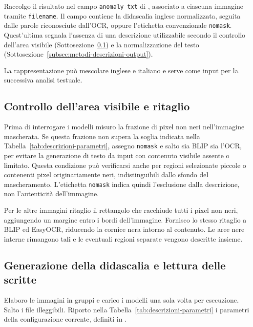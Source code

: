 Raccolgo il risultato nel campo \texttt{anomaly\_txt} di , associato a ciascuna immagine tramite \texttt{filename}. Il campo contiene la didascalia inglese normalizzata, seguita dalle parole riconosciute dall'OCR, oppure l'etichetta convenzionale \texttt{nomask}. Quest'ultima segnala l'assenza di una descrizione utilizzabile secondo il controllo dell'area visibile (Sottosezione~\ref{subsec:metodi-descrizioni-input}) e la normalizzazione del testo (Sottosezione~\ref{subsec:metodi-descrizioni-output}).

La rappresentazione può mescolare inglese e italiano e serve come input per la successiva analisi testuale.

\subsection{Controllo dell'area visibile e ritaglio}
\label{subsec:metodi-descrizioni-input}

Prima di interrogare i modelli misuro la frazione di pixel non neri nell'immagine mascherata. Se questa frazione non supera la soglia indicata nella Tabella~\ref{tab:descrizioni-parametri}, assegno \texttt{nomask} e salto sia BLIP sia l'OCR, per evitare la generazione di testo da input con contenuto visibile assente o limitato. Questa condizione può verificarsi anche per regioni selezionate piccole o contenenti pixel originariamente neri, indistinguibili dallo sfondo del mascheramento. L'etichetta \texttt{nomask} indica quindi l'esclusione dalla descrizione, non l'autenticità dell'immagine.

Per le altre immagini ritaglio il rettangolo che racchiude tutti i pixel non neri, aggiungendo un margine entro i bordi dell'immagine. Fornisco lo stesso ritaglio a BLIP ed EasyOCR, riducendo la cornice nera intorno al contenuto. Le aree nere interne rimangono tali e le eventuali regioni separate vengono descritte insieme.

\subsection{Generazione della didascalia e lettura delle scritte}
\label{subsec:metodi-descrizioni-modelli}

Elaboro le immagini in gruppi e carico i modelli una sola volta per esecuzione. Salto i file illeggibili. Riporto nella Tabella~\ref{tab:descrizioni-parametri} i parametri della configurazione corrente, definiti in .

